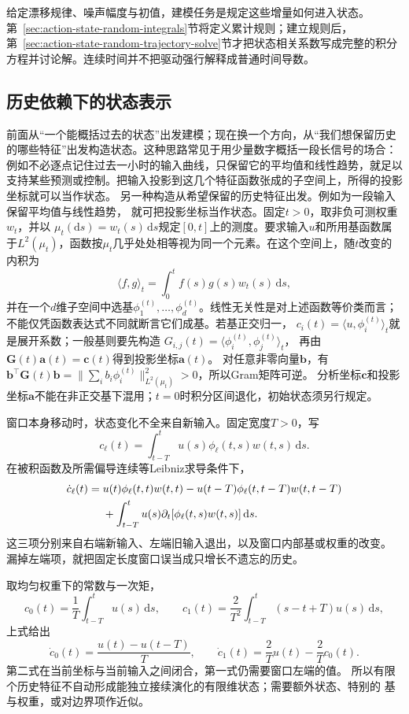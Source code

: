 给定漂移规律、噪声幅度与初值，建模任务是规定这些增量如何进入状态。第~\ref{sec:action-state-random-integrals}节将定义累计规则；建立规则后，第~\ref{sec:action-state-random-trajectory-solve}节才把状态相关系数写成完整的积分方程并讨论解。连续时间并不把驱动强行解释成普通时间导数。

\subsection{历史依赖下的状态表示}
前面从“一个能概括过去的状态”出发建模；现在换一个方向，从“我们想保留历史的哪些特征”出发构造状态。这种思路常见于用少量数字概括一段长信号的场合：例如不必逐点记住过去一小时的输入曲线，只保留它的平均值和线性趋势，就足以支持某些预测或控制。把输入投影到这几个特征函数张成的子空间上，所得的投影坐标就可以当作状态。
另一种构造从希望保留的历史特征出发。例如为一段输入保留平均值与线性趋势，
就可把投影坐标当作状态。固定$t>0$，取非负可测权重$w_t$，并以
$\mu_t(\mathrm ds)=w_t(s)\,\mathrm ds$规定$[0,t]$上的测度。要求输入$u$和所用基函数属于$L^2(\mu_t)$，函数按$\mu_t$几乎处处相等视为同一个元素。在这个空间上，随$t$改变的内积为
\[
  \langle f,g\rangle_t=\int_0^t f(s)g(s)w_t(s)\,\mathrm ds,
\]
并在一个$d$维子空间中选基$\phi_1^{(t)},\ldots,\phi_d^{(t)}$。线性无关性是对上述函数等价类而言；不能仅凭函数表达式不同就断言它们成基。若基正交归一，
$c_i(t)=\langle u,\phi_i^{(t)}\rangle_t$就是展开系数；一般基则要先构造
$G_{i,j}(t)=\langle\phi_i^{(t)},\phi_j^{(t)}\rangle_t$，
再由$\bm G(t)\bm a(t)=\bm c(t)$得到投影坐标$\bm a(t)$。
对任意非零向量$\bm b$，有
$\bm b^\top\bm G(t)\bm b=\|\sum_i b_i\phi_i^{(t)}\|_{L^2(\mu_t)}^2>0$，所以Gram矩阵可逆。
分析坐标$\bm c$和投影坐标$\bm a$不能在非正交基下混用；$t=0$时积分区间退化，初始状态须另行规定。

窗口本身移动时，状态变化不全来自新输入。固定宽度$T>0$，写
\[
  c_\ell(t)=\int_{t-T}^t u(s)\phi_\ell(t,s)w(t,s)\,\mathrm ds.
\]
在被积函数及所需偏导连续等Leibniz求导条件下，
\begin{align}
  \dot c_\ell(t)
  ={}&u(t)\phi_\ell(t,t)w(t,t)
    -u(t-T)\phi_\ell(t,t-T)w(t,t-T)\notag\\
  &+\int_{t-T}^t u(s)\partial_t[\phi_\ell(t,s)w(t,s)]\,\mathrm ds.
  \label{eq:dynamical-moving-window-coefficient}
\end{align}
这三项分别来自右端新输入、左端旧输入退出，以及窗口内部基或权重的改变。
漏掉左端项，就把固定长度窗口误当成只增长不遗忘的历史。

取均匀权重下的常数与一次矩，
\[
  c_0(t)=\frac1T\int_{t-T}^t u(s)\,\mathrm ds,\qquad
  c_1(t)=\frac2{T^2}\int_{t-T}^t(s-t+T)u(s)\,\mathrm ds,
\]
上式给出
\[
  \dot c_0(t)=\frac{u(t)-u(t-T)}T,\qquad
  \dot c_1(t)=\frac2T u(t)-\frac2T c_0(t).
\]
第二式在当前坐标与当前输入之间闭合，第一式仍需要窗口左端的值。
所以有限个历史特征不自动形成能独立接续演化的有限维状态；需要额外状态、特别的
基与权重，或对边界项作近似。


